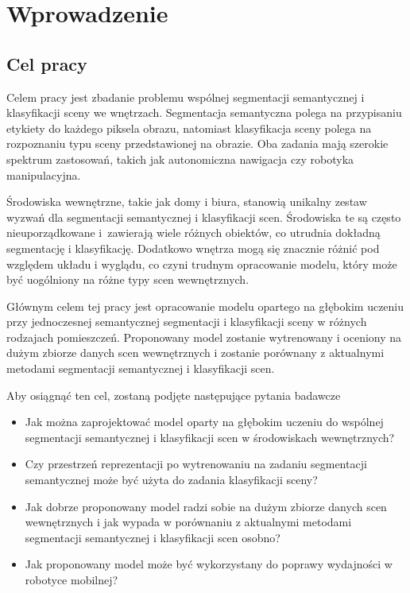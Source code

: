 \newpage %
\section{Wprowadzenie}

\subsection{Cel pracy}
Celem pracy jest zbadanie problemu wspólnej segmentacji semantycznej i klasyfikacji sceny we wnętrzach. Segmentacja semantyczna polega na przypisaniu etykiety do każdego piksela obrazu, natomiast klasyfikacja sceny polega na rozpoznaniu typu sceny przedstawionej na obrazie. Oba zadania mają szerokie spektrum zastosowań, takich jak autonomiczna nawigacja czy robotyka manipulacyjna.

Środowiska wewnętrzne, takie jak domy i biura, stanowią unikalny zestaw wyzwań dla segmentacji semantycznej i klasyfikacji scen. Środowiska te są często nieuporządkowane i~zawierają wiele różnych obiektów, co utrudnia dokładną segmentację i klasyfikację. Dodatkowo wnętrza mogą się znacznie różnić pod względem układu i wyglądu, co czyni trudnym opracowanie modelu, który może być uogólniony na różne typy scen wewnętrznych.

Głównym celem tej pracy jest opracowanie modelu opartego na głębokim uczeniu przy jednoczesnej semantycznej segmentacji i klasyfikacji sceny w różnych rodzajach pomieszczeń. Proponowany model zostanie wytrenowany i oceniony na dużym zbiorze danych scen wewnętrznych i zostanie porównany z aktualnymi metodami segmentacji semantycznej i klasyfikacji scen.

Aby osiągnąć ten cel, zostaną podjęte następujące pytania badawcze
\begin{itemize}
    \item Jak można zaprojektować model oparty na głębokim uczeniu do wspólnej segmentacji semantycznej i klasyfikacji scen w środowiskach wewnętrznych?
    \item Czy przestrzeń reprezentacji po wytrenowaniu na zadaniu segmentacji semantycznej może być użyta do zadania klasyfikacji sceny?
    \item Jak dobrze proponowany model radzi sobie na dużym zbiorze danych scen wewnętrznych i jak wypada w porównaniu z aktualnymi metodami segmentacji semantycznej i klasyfikacji scen osobno?
    \item Jak proponowany model może być wykorzystany do poprawy wydajności w robotyce mobilnej?
\end{itemize}

